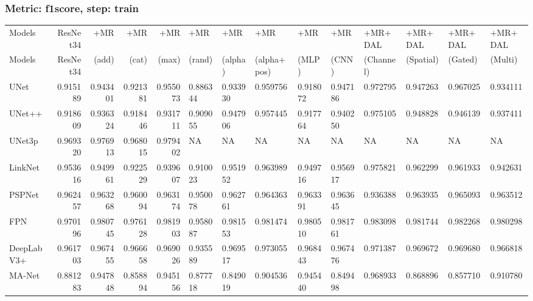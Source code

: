 \documentclass{article}
\begin{document}
\subsubsection{Metric: f1score, step: train}
\begin{tabular}{lrrrrlllllllll}
\toprule
Models & ResNet34 & +MR  & +MR  & +MR  & +MR  & +MR  & +MR  & +MR  & +MR  & +MR+DAL & +MR+DAL & +MR+DAL & +MR+DAL \\
Models & ResNet34 &  (add) &  (cat) &  (max) &  (rand) &  (alpha) &  (alpha+pos) &  (MLP) &  (CNN) & (Channel) & (Spatial) & (Gated) & (Multi) \\
\midrule
UNet & 0.915189 & 0.943401 & 0.921381 & 0.955073 & 0.886344 & 0.933930 & 0.959756 & 0.918072 & 0.947186 & 0.972795 & 0.947263 & 0.967025 & 0.934111 \\
UNet++ & 0.918609 & 0.936324 & 0.918446 & 0.931711 & 0.909055 & 0.947906 & 0.957445 & 0.917764 & 0.940250 & 0.975105 & 0.948828 & 0.946139 & 0.937411 \\
UNet3p & 0.969320 & 0.976913 & 0.968015 & 0.979402 & NA & NA & NA & NA & NA & NA & NA & NA & NA \\
LinkNet & 0.953616 & 0.949961 & 0.922529 & 0.939607 & 0.910023 & 0.951952 & 0.963989 & 0.949716 & 0.956917 & 0.975821 & 0.962299 & 0.961933 & 0.942631 \\
PSPNet & 0.962457 & 0.963268 & 0.960094 & 0.963174 & 0.950078 & 0.962761 & 0.964363 & 0.963391 & 0.963645 & 0.936388 & 0.963935 & 0.965093 & 0.963512 \\
FPN & 0.970196 & 0.980745 & 0.976128 & 0.981903 & 0.958087 & 0.981553 & 0.981474 & 0.980510 & 0.981761 & 0.983098 & 0.981744 & 0.982268 & 0.980298 \\
DeepLabV3+ & 0.961703 & 0.967455 & 0.966658 & 0.969026 & 0.935589 & 0.969517 & 0.973055 & 0.968443 & 0.967476 & 0.971387 & 0.969672 & 0.969680 & 0.966818 \\
MA-Net & 0.881283 & 0.947848 & 0.858894 & 0.945156 & 0.877718 & 0.849019 & 0.904536 & 0.945440 & 0.849498 & 0.968933 & 0.868896 & 0.857710 & 0.910780 \\
\bottomrule
\end{tabular}
\end{document}
